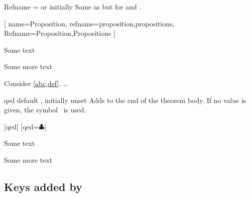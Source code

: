 \documentclass{ltxdoc}
\begin{document}
\begin{docKey}{Refname}
  {= \textrm{or} }
  {initially }
Same as  but for  and .

\begin{tcbwritetemp}
[
  name=Proposition,
  refname={proposition,propositions},
  Refname={Proposition,Propositions}
  ]
\end{tcbwritetemp}

\begin{keythmscode}[withpreamble]
\begin{prop}[label=abc]
Some text
\end{prop}
\begin{prop}[label=def]
Some more text
\end{prop}
\begin{theorem}
Consider \cref{abc,def}.
 \dots
\end{theorem}
\end{keythmscode}

\end{docKey}

\begin{docKey}{qed}
  {}
  {default , initially unset}
Adds  to the end of the theorem body. If no value is given, the symbol \openbox\ is used.

\begin{tcbwritetemp}
[qed]
[qed=$\clubsuit$]
\end{tcbwritetemp}

\begin{keythmscode}[withpreamble]
\begin{example}
Some text
\end{example}
\begin{solution}
Some more text
\end{solution}
\end{keythmscode}

\end{docKey}

\subsection{Keys added by } \label{thm-added-keys}
\end{document}
